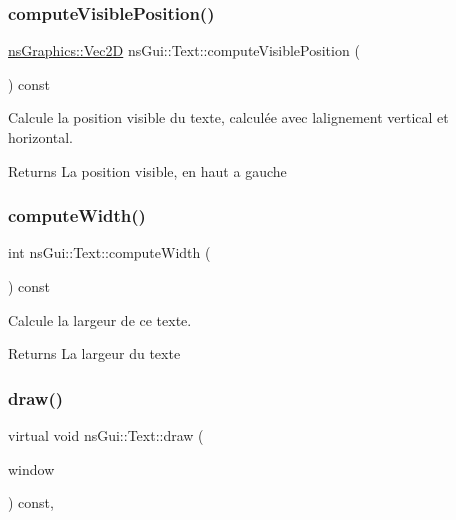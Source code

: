 \subsubsection{\texorpdfstring{compute\+Visible\+Position()}{computeVisiblePosition()}}
{\footnotesize\ttfamily \hyperlink{classns_graphics_1_1_vec2_d}{ns\+Graphics\+::\+Vec2D} ns\+Gui\+::\+Text\+::compute\+Visible\+Position (\begin{DoxyParamCaption}{ }\end{DoxyParamCaption}) const}



Calcule la position visible du texte, calculée avec l\textquotesingle{}alignement vertical et horizontal. 

\begin{DoxyReturn}{Returns}
La position visible, en haut a gauche 
\end{DoxyReturn}
\mbox{\label{classns_gui_1_1_text_a5ad119bf3e6c774c00711bb302f4bb1e}} 
\subsubsection{\texorpdfstring{compute\+Width()}{computeWidth()}}
{\footnotesize\ttfamily int ns\+Gui\+::\+Text\+::compute\+Width (\begin{DoxyParamCaption}{ }\end{DoxyParamCaption}) const}



Calcule la largeur de ce texte. 

\begin{DoxyReturn}{Returns}
La largeur du texte 
\end{DoxyReturn}
\mbox{\label{classns_gui_1_1_text_ac353893e3b7cce7585c619acbc0e255b}} 
\subsubsection{\texorpdfstring{draw()}{draw()}}
{\footnotesize\ttfamily virtual void ns\+Gui\+::\+Text\+::draw (\begin{DoxyParamCaption}\item[{\hyperlink{class_min_g_l}{Min\+GL} \&}]{window }\end{DoxyParamCaption}) const\hspace{0.3cm}{\ttfamily [override]}, {\ttfamily [virtual]}}



